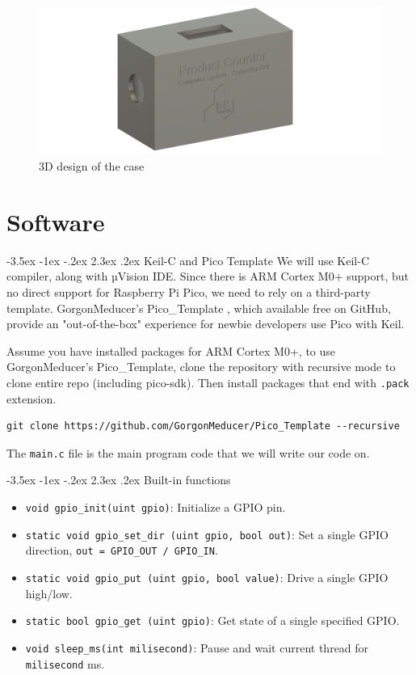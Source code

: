 \documentclass[13pt,a4paper,twoside]{report}
\makeatletter
\renewcommand\section{\@startsection {section}{1}{-1em}%
  {-3.5ex \@plus -1ex \@minus -.2ex}%
  {2.3ex \@plus.2ex}%
  {\normalfont\Large\bfseries}}
\makeatother
\begin{document}
\begin{figure}[H]
\centering
\includegraphics[scale=0.1]{images/device_3d.png}
\caption{3D design of the case}
\end{figure}
\chapter{Software}

\section{Keil-C and Pico Template}
We will use Keil-C compiler, along with µVision IDE. Since there is ARM Cortex M0+ support, but no direct support for Raspberry Pi Pico, we need to rely on a third-party template. GorgonMeducer's Pico\_Template \cite{pico_mdk}, which available free on GitHub, provide an "out-of-the-box" experience for newbie developers use Pico with Keil.

Assume you have installed packages for ARM Cortex M0+, to use GorgonMeducer's Pico\_Template, clone the repository with recursive mode to clone entire repo (including pico-sdk). Then install packages that end with \texttt{.pack} extension. 
\begin{verbatim}
git clone https://github.com/GorgonMeducer/Pico_Template --recursive
\end{verbatim}

The \texttt{main.c} file is the main program code that we will write our code on.

\section{Built-in functions}
\begin{itemize}
\item \texttt{void gpio_init(uint gpio)}: Initialize a GPIO pin.
\item \texttt{static void gpio_set_dir (uint gpio, bool out)}: Set a single GPIO direction, \texttt{out = GPIO\_OUT / GPIO\_IN}.
\item \texttt{static void gpio_put (uint gpio, bool value)}: Drive a single GPIO high/low.
\item \texttt{static bool gpio_get (uint gpio)}: Get state of a single specified GPIO.
\item \texttt{void sleep_ms(int milisecond)}: Pause and wait current thread for \texttt{milisecond} ms.
\end{itemize}
\end{document}
